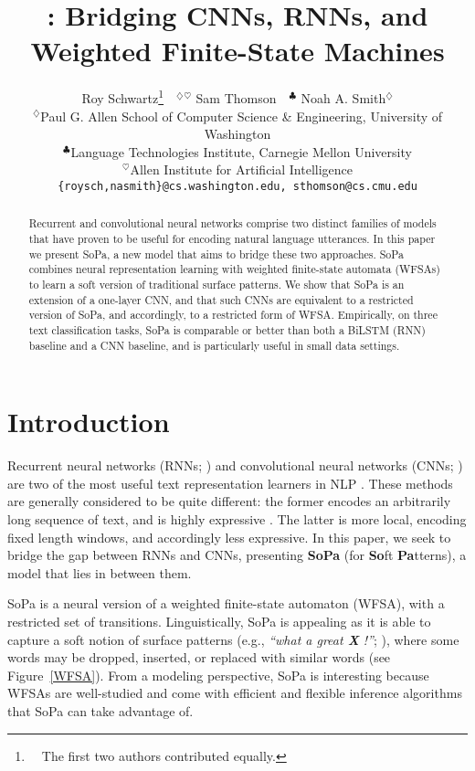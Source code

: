 \documentclass[11pt,a4paper]{article}
\title{\SoftP: Bridging CNNs, RNNs, and Weighted Finite-State Machines}
\author{Roy Schwartz\thanks{~~The first two authors contributed equally.}~~$^\diamondsuit$$^\heartsuit$ \quad
  Sam Thomson\footnotemark[1]~~$^\clubsuit$  \quad
  Noah A. Smith$^\diamondsuit$ \\
  $^\diamondsuit$Paul G. Allen School of Computer Science \& Engineering,
  University of Washington \\ %
  $^\clubsuit$Language Technologies Institute,
  Carnegie Mellon University \\ %
  $^\heartsuit$Allen Institute for Artificial Intelligence \\
  {\tt \{roysch,nasmith\}@cs.washington.edu,
    sthomson@cs.cmu.edu}
}
\date{}
\newcommand{\figref}[1]{Figure~\ref{#1}}
\newcommand{\interalia}[1]{\citep{#1}} %
\newcommand{\SoftP}{SoPa\xspace}
\newcommand{\term}[1]{\textbf{#1}} %
\newcommand{\relat}{an extension of\xspace}
\begin{document}
\maketitle
\begin{abstract}
Recurrent and convolutional neural networks comprise two distinct families of
models that have proven to be useful for encoding natural language utterances.
In this paper we present \SoftP, a new model that aims to bridge these two approaches.
\SoftP combines neural representation learning with weighted finite-state automata (WFSAs) to learn a soft version of traditional surface patterns. 
We show that \SoftP is \relat a one-layer CNN, and that such CNNs are equivalent to a restricted version of \SoftP, and accordingly, to a restricted form of WFSA. 
Empirically, on three text classification tasks, \SoftP is comparable or better than both a BiLSTM (RNN) baseline and a CNN baseline, and is particularly useful in small data settings. 

\end{abstract}

\section{Introduction}




Recurrent neural networks (RNNs; \citealp{Elman:1990}) and convolutional neural networks (CNNs; \citealp{lecun_gradient-based_1998}) 
are two of the most useful text representation learners in NLP \citep{Goldberg:2016}.
These methods are generally considered to be quite different: 
the former encodes an arbitrarily long sequence of text, and is highly expressive \citep{Siegelmann:1995}.
The latter is more local, encoding fixed length windows, and accordingly less expressive.
In this paper, we seek to bridge the gap between RNNs and CNNs, presenting \term{\SoftP} (for \textbf{So}ft {\bf Pa}tterns), a model that lies in between them.

\SoftP is a neural version of a weighted finite-state automaton (WFSA), with a restricted set of transitions.
Linguistically, \SoftP is appealing as it is able to capture a soft notion of surface
patterns (e.g., \textit{``what a great \textbf{X} !''}; \citealp{Hearst:1992}), where some words may be dropped, inserted, or replaced with similar words (see \figref{WFSA}).
From a modeling perspective, \SoftP{} is interesting because WFSAs are
well-studied and come with efficient and flexible inference algorithms
\interalia{mohri_finite_1997,eisner_parameter_2002} that \SoftP{} can take
advantage of.
\end{document}
